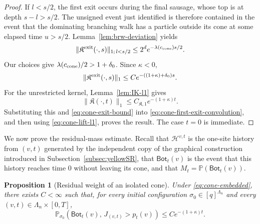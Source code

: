 \documentclass[letterpaper,11pt,reqno]{amsart}
\newtheorem{prop}[thm]{Proposition}
\theoremstyle{definition}
\newcommand{\IK}{\mathfrak{K}}
\begin{document}
\begin{proof}
If \(l<s/2\), the first exit occurs during the final sausage, whose top is at depth
\(s-l>s/2\). The unsigned event just identified is therefore contained in the event that the
dominating branching walk has a particle outside its cone at some elapsed time \(u>s/2\).
Lemma~\ref{lem:brw-deviation} yields
\[
        \|\IK^{\rm exit}(\cdot,s)\|_{1;\,l<s/2}
        \le
        2^d e^{-\lambda(c_{\rm cone})s/2}.
\]
Our choices give \(\lambda(c_{\rm cone})/2>1+\delta_0\). Since \(\kappa<0\),
\begin{equation}\label{eq:cone-exit-bound}
        \|\IK^{\rm exit}(\cdot,s)\|_1
        \le
        Ce^{-((1+\kappa)+\delta_0)s}.
\end{equation}
For the unrestricted kernel, Lemma~\ref{lem:IK-l1} gives
\[
        \|\IK(\cdot,t)\|_1\le C_{\IK,1}e^{-(1+\kappa)t}.
\]
Substituting this and \eqref{eq:cone-exit-bound} into
\eqref{eq:cone-first-exit-convolution}, and then using
\eqref{eq:cone-lift-l1}, proves the result. The case \(t=0\) is immediate.
\end{proof}



We now prove the residual-mass estimate. Recall that
\(\mathcal H^{v,t}\) is the one-site history from \((v,t)\) generated by the
independent copy of the graphical construction introduced in
Subsection~\ref{subsec:yellowSR}, that
\(\mathsf{Bot}_t(v)\) is the event that this history reaches time \(0\)
without leaving its cone, and that
\(M_t=\mathbb P(\mathsf{Bot}_t(v))\).





\begin{prop}[Residual weight of an isolated cone]\label{prop:isolated-cone-residual}
Under \eqref{eq:cone-embedded}, there exists \(C<\infty\) such that, for every
initial configuration \(\sigma_0\in[q]^{\Lambda_n}\) and every
\((v,t)\in\Lambda_n\times[0,T]\),
\[
\mathbb{P}_{\sigma_0}\left(
\mathsf{Bot}_t(v),\,J_{(v,t)}>p_t(v)
\right)\leq C e^{-(1+\kappa)t}.
\]
\end{prop}
\end{document}
